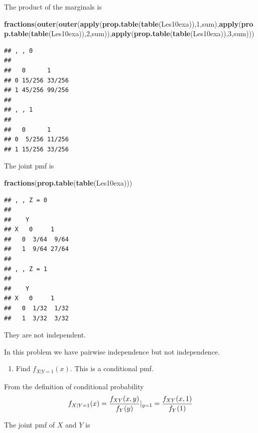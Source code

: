 \documentclass[]{book}
\newenvironment{Shaded}{\begin{snugshade}}{\end{snugshade}}
\newcommand{\KeywordTok}[1]{\textcolor[rgb]{0.13,0.29,0.53}{\textbf{#1}}}
\newcommand{\DecValTok}[1]{\textcolor[rgb]{0.00,0.00,0.81}{#1}}
\newcommand{\NormalTok}[1]{#1}
\providecommand{\tightlist}{%
  \setlength{\itemsep}{0pt}\setlength{\parskip}{0pt}}
\theoremstyle{definition}
\theoremstyle{definition}
\theoremstyle{definition}
\theoremstyle{remark}
\begin{document}
The product of the marginals is

\begin{Shaded}
\begin{Highlighting}[]
\KeywordTok{fractions}\NormalTok{(}\KeywordTok{outer}\NormalTok{(}\KeywordTok{outer}\NormalTok{(}\KeywordTok{apply}\NormalTok{(}\KeywordTok{prop.table}\NormalTok{(}\KeywordTok{table}\NormalTok{(Les10exa)),}\DecValTok{1}\NormalTok{,sum),}\KeywordTok{apply}\NormalTok{(}\KeywordTok{prop.table}\NormalTok{(}\KeywordTok{table}\NormalTok{(Les10exa)),}\DecValTok{2}\NormalTok{,sum)),}\KeywordTok{apply}\NormalTok{(}\KeywordTok{prop.table}\NormalTok{(}\KeywordTok{table}\NormalTok{(Les10exa)),}\DecValTok{3}\NormalTok{,sum)))}
\end{Highlighting}
\end{Shaded}

\begin{verbatim}
## , , 0
## 
##   0      1     
## 0 15/256 33/256
## 1 45/256 99/256
## 
## , , 1
## 
##   0      1     
## 0  5/256 11/256
## 1 15/256 33/256
\end{verbatim}

The joint pmf is

\begin{Shaded}
\begin{Highlighting}[]
\KeywordTok{fractions}\NormalTok{(}\KeywordTok{prop.table}\NormalTok{(}\KeywordTok{table}\NormalTok{(Les10exa)))}
\end{Highlighting}
\end{Shaded}

\begin{verbatim}
## , , Z = 0
## 
##    Y
## X   0     1    
##   0  3/64  9/64
##   1  9/64 27/64
## 
## , , Z = 1
## 
##    Y
## X   0     1    
##   0  1/32  1/32
##   1  3/32  3/32
\end{verbatim}

They are not independent.

In this problem we have pairwise independence but not independence.

\begin{enumerate}
\def\labelenumi{\arabic{enumi}.}
\setcounter{enumi}{6}
\tightlist
\item
  Find \(f_{X|Y=1}(x)\). This is a conditional pmf.
\end{enumerate}

From the definition of conditional probability
\[f_{X|Y=1}(x)={f_{XY}(x,y) \over f_{Y}(y)}|_{y=1}={f_{XY}(x,1) \over f_{Y}(1)}\]

The joint pmf of \(X\) and \(Y\) is
\end{document}
